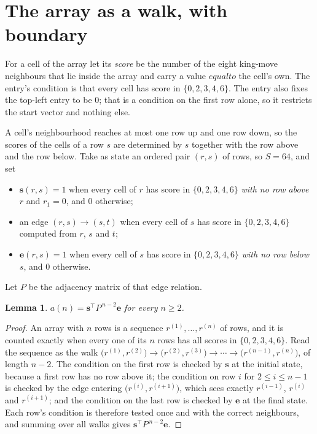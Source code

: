 \documentclass[11pt,a4paper]{article}
\theoremstyle{plain}
\newtheorem{lemma}[theorem]{Lemma}
\theoremstyle{definition}
\begin{document}
\section{The array as a walk, with boundary}

For a cell of the array let its \emph{score} be the number of the eight king-move neighbours that lie inside
the array and carry a value $equal to$ the cell's own. The entry's condition is that every cell
has score in $\{0,2,3,4,6\}$. The entry also fixes the top-left entry to be $0$; that is a condition on the first row alone, so it restricts the start vector and nothing else.

A cell's neighbourhood reaches at most one row up and one row down, so the scores of the
cells of a row $s$ are determined by $s$ together with the row above and the row below.
Take as state an ordered pair $(r,s)$ of rows, so $S=64$, and set
\begin{itemize}
\item $\mathbf{s}(r,s)=1$ when every cell of $r$ has score in $\{0,2,3,4,6\}$ \emph{with no row
above $r$} and $r_1=0$, and $0$ otherwise;
\item an edge $(r,s)\to(s,t)$ when every cell of $s$ has score in $\{0,2,3,4,6\}$ computed from
$r$, $s$ and $t$;
\item $\mathbf{e}(r,s)=1$ when every cell of $s$ has score in $\{0,2,3,4,6\}$ \emph{with no row
below $s$}, and $0$ otherwise.
\end{itemize}
Let $P$ be the adjacency matrix of that edge relation.

\begin{lemma}\label{lem:walk}
$a(n)=\mathbf{s}^{\!\top}P^{\,n-2}\mathbf{e}$ for every $n\ge2$.
\end{lemma}

\begin{proof}
An array with $n$ rows is a sequence $r^{(1)},\dots,r^{(n)}$ of rows, and it is counted
exactly when every one of its $n$ rows has all scores in $\{0,2,3,4,6\}$. Read the sequence as the
walk $\bigl(r^{(1)},r^{(2)}\bigr)\to\bigl(r^{(2)},r^{(3)}\bigr)\to\cdots\to
\bigl(r^{(n-1)},r^{(n)}\bigr)$, of length $n-2$. The condition on the first row is
checked by $\mathbf{s}$ at the initial state, because a first row has no row above it; the
condition on row $i$ for $2\le i\le n-1$ is checked by the edge entering
$\bigl(r^{(i)},r^{(i+1)}\bigr)$, which sees exactly $r^{(i-1)}$, $r^{(i)}$ and
$r^{(i+1)}$; and the condition on the last row is checked by $\mathbf{e}$ at the final
state. Each row's condition is therefore tested once and with the correct neighbours, and
summing over all walks gives $\mathbf{s}^{\!\top}P^{\,n-2}\mathbf{e}$.
\end{proof}
\end{document}
